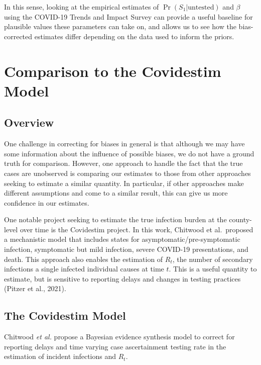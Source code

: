 \documentclass[12pt,twoside]{smiththesis}
\begin{document}
In this sense, looking at the empirical estimates of \(\Pr(S_1|\text{untested})\) and \(\beta\) using the COVID-19 Trends and Impact Survey can provide a useful baseline for plausible values these parameters can take on, and allows us to see how the bias-corrected estimates differ depending on the data used to inform the priors.

\hypertarget{comparison-to-the-covidestim-model}{%
\chapter{Comparison to the Covidestim Model}\label{comparison-to-the-covidestim-model}}

\hypertarget{overview-3}{%
\section{Overview}\label{overview-3}}

One challenge in correcting for biases in general is that although we may have some information about the influence of possible biases, we do not have a ground truth for comparison. However, one approach to handle the fact that the true cases are unobserved is comparing our estimates to those from other approaches seeking to estimate a similar quantity. In particular, if other approaches make different assumptions and come to a similar result, this can give us more confidence in our estimates.

One notable project seeking to estimate the true infection burden at the county-level over time is the Covidestim project. In this work, Chitwood et al.~proposed a mechanistic model that includes states for asymptomatic/pre-symptomatic infection, symptomatic but mild infection, severe COVID-19 presentations, and death. This approach also enables the estimation of \(R_t\), the number of secondary infections a single infected individual causes at time \(t\). This is a useful quantity to estimate, but is sensitive to reporting delays and changes in testing practices (Pitzer et al., 2021).

\hypertarget{the-covidestim-model}{%
\section{The Covidestim Model}\label{the-covidestim-model}}

Chitwood \emph{et al.} propose a Bayesian evidence synthesis model to correct for reporting delays and time varying case ascertainment testing rate in the estimation of incident infections and \(R_t\).
\end{document}

